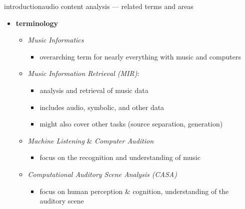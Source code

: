         \begin{frame}{introduction}{audio content analysis --- related terms and areas}
            \begin{itemize}
                \item   \textbf{terminology}
                    \bigskip
                    \begin{itemize}
                        \item   \textit{Music Informatics}
                            \begin{itemize}
                                \item   overarching term for nearly everything with music and computers
                            \end{itemize}
                                
                        \smallskip
                        \item	\textit{Music Information Retrieval (MIR)}:
                            \begin{itemize}
                                \item   analysis and retrieval of music data 
                                \item   includes audio, symbolic, and other data
                                \item   might also cover other tasks (source separation, generation)
                            \end{itemize}
                                
                        \smallskip
                        \item	\textit{Machine Listening} \& \textit{Computer Audition}
                            \begin{itemize}
                                \item   focus on the recognition and understanding of music
                            \end{itemize}
                            
                        \smallskip
                        \item	\textit{Computational Auditory Scene Analysis (CASA)}
                            \begin{itemize}
                                \item   focus on human perception \& cognition, understanding of the auditory scene
                            \end{itemize}
                    \end{itemize}
           \end{itemize}
        \end{frame}
